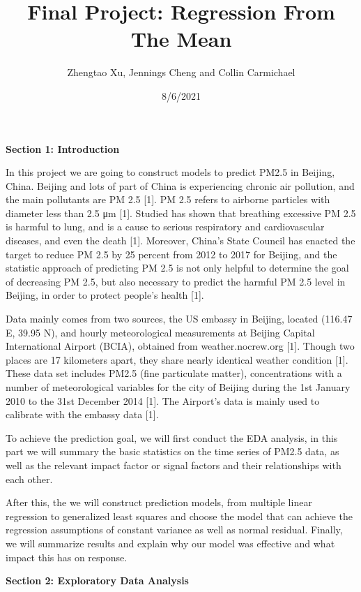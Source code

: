 \documentclass[
]{article}
\title{Final Project: Regression From The Mean}
\author{Zhengtao Xu, Jennings Cheng and Collin Carmichael}
\date{8/6/2021}
\begin{document}
\maketitle

\textbf{Section 1: Introduction}

In this project we are going to construct models to predict PM2.5 in
Beijing, China. Beijing and lots of part of China is experiencing
chronic air pollution, and the main pollutants are PM 2.5 {[}1{]}. PM
2.5 refers to airborne particles with diameter less than 2.5 μm {[}1{]}.
Studied has shown that breathing excessive PM 2.5 is harmful to lung,
and is a cause to serious respiratory and cardiovascular diseases, and
even the death {[}1{]}. Moreover, China's State Council has enacted the
target to reduce PM 2.5 by 25 percent from 2012 to 2017 for Beijing, and
the statistic approach of predicting PM 2.5 is not only helpful to
determine the goal of decreasing PM 2.5, but also necessary to predict
the harmful PM 2.5 level in Beijing, in order to protect people's health
{[}1{]}.

Data mainly comes from two sources, the US embassy in Beijing, located
(116.47 E, 39.95 N), and hourly meteorological measurements at Beijing
Capital International Airport (BCIA), obtained from weather.nocrew.org
{[}1{]}. Though two places are 17 kilometers apart, they share nearly
identical weather condition {[}1{]}. These data set includes PM2.5 (fine
particulate matter), concentrations with a number of meteorological
variables for the city of Beijing during the 1st January 2010 to the
31st December 2014 {[}1{]}. The Airport's data is mainly used to
calibrate with the embassy data {[}1{]}.

To achieve the prediction goal, we will first conduct the EDA analysis,
in this part we will summary the basic statistics on the time series of
PM2.5 data, as well as the relevant impact factor or signal factors and
their relationships with each other.

After this, the we will construct prediction models, from multiple
linear regression to generalized least squares and choose the model that
can achieve the regression assumptions of constant variance as well as
normal residual. Finally, we will summarize results and explain why our
model was effective and what impact this has on response.

\textbf{Section 2: Exploratory Data Analysis}
\end{document}
